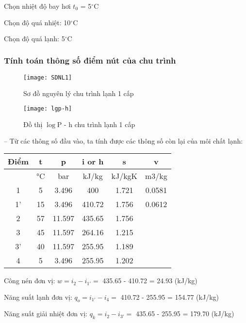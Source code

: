 Chọn nhiệt độ bay hơi $t_{0}$ = 5$^{\circ}$C

Chọn độ quá nhiệt: 10$^{\circ}$C

Chọn độ quá lạnh: 5$^{\circ}$C

\subsubsection{Tính toán thông số điểm nút của chu trình}
\begin{figure}[H]
	\centering
	\texttt{[image: SDNL1]}
	\caption{Sơ đồ nguyên lý chu trình lạnh 1 cấp}
	\texttt{[image: lgp-h]}
	\caption{Đồ thị $\log$P - h chu trình lạnh 1 cấp}
\end{figure}

-- Từ các thông số đầu vào, ta tính được các thông số còn lại của môi chất lạnh:

\begin{table}[H]
	\vspace{0.5cm}
	\centering
	\begin{adjustbox}{width=.5\textwidth}
	\begin{tabular}{|c|c|c|c|c|c|}
		\hline
		Điểm  & t     & p     & i or h & s     & v \bigstrut\\
		\hline
		& °C    & bar   & kJ/kg & kJ/kgK & m3/kg \bigstrut\\
		\hline
		1     & 5     & 3.496 & 400   & 1.721 & 0.0581 \bigstrut\\
		\hline
		1'    & 15    & 3.496 & 410.72 & 1.756 & 0.0612 \bigstrut\\
		\hline
		2     & 57    & 11.597 & 435.65 & 1.756 &  \bigstrut\\
		\hline
		3     & 45    & 11.597 & 264.16 & 1.215 &  \bigstrut\\
		\hline
		3'    & 40    & 11.597 & 255.95 & 1.189 &  \bigstrut\\
		\hline
		4     & 5     & 3.496 & 255.95 & 1.202 &  \bigstrut\\
		\hline
	\end{tabular}%
	\end{adjustbox}
\end{table}

Công nén đơn vị: $w = i_{2} - i_{1'} = $ 435.65 - 410.72 = 24.93 (kJ/kg)

Năng suất lạnh đơn vị: $q_{o} = i_{1'} - i_{4} = $ 410.72 - 255.95 = 154.77 (kJ/kg)

Năng suất giải nhiệt đơn vị: $q_{k} = i_{2} - i_{3'} = $ 435.65 - 255.95 = 179.70 (kJ/kg)

